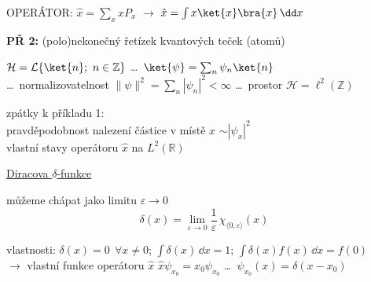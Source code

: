 \documentclass[11pt,a4paper]{article}
\begin{document}
OPERÁTOR: \qquad $\hat x = \sum_x xP_x$ \quad $\longrightarrow$ \quad $\hat x = \int x\ket{x}\bra{x}\,\dd x$

\textbf{PŘ 2:} (polo)nekonečný řetízek kvantových teček (atomů)

\begin{center}
\end{center}

$\mathcal{H} = \mathcal{L}\{\ket{n};\ n\in\mathbb{Z}\}$ \quad \dots\ $\ket{\psi} = \sum_n\psi_n\ket{n}$ \\
\dots\ normalizovatelnost \quad $\|\psi\|^2 = \sum_n|\psi_n|^2 < \infty$ \quad \dots\ prostor $\mathcal{H} = \ell^2(\mathbb{Z})$

zpátky k příkladu 1: \\
\quad pravděpodobnost nalezení částice v místě $x$ $\sim|\psi_x|^2$ \\
\quad vlastní stavy operátoru $\hat x$ na $L^2(\mathbb{R})$

\begin{minipage}{0.58\textwidth}
\underline{Diracova $\delta$-funkce}

můžeme chápat jako limitu $\varepsilon\to 0$
\[
  \delta(x) = \lim_{\varepsilon\to 0}\frac{1}{\varepsilon}\,\chi_{\langle 0,\varepsilon\rangle}(x)
\]
\end{minipage}
\begin{minipage}{0.4\textwidth}
\end{minipage}

vlastnosti: \quad $\delta(x) = 0\ \ \forall x\neq 0$; \quad $\int\delta(x)\,\dd x = 1$; \quad $\int\delta(x)f(x)\,\dd x = f(0)$ \\
$\to$ vlastní funkce operátoru $\hat x$ \quad $\hat x\psi_{x_0} = x_0\psi_{x_0}$ \quad \dots\ $\psi_{x_0}(x) = \delta(x - x_0)$
\end{document}
